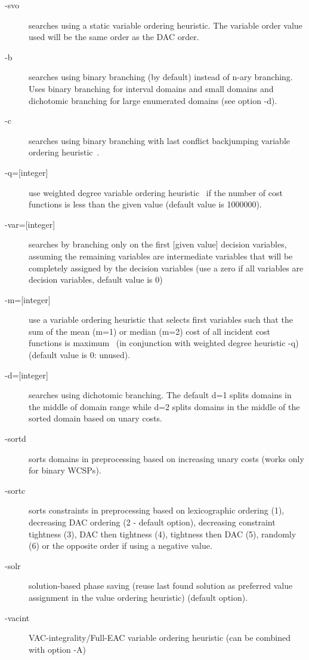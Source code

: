 \documentclass{article}
\begin{document}
\begin{description}
\item[-svo] searches using a static variable ordering heuristic. The
  variable order value used will be the same order as the DAC order.
\item[-b] searches using binary branching (by default) instead of n-ary branching.
  Uses binary branching for interval domains and small domains
  and dichotomic branching for large enumerated domains (see option -d).
\item[-c] searches using binary branching with last conflict
  backjumping variable ordering heuristic~\cite{Lecoutre09}.
\item[{-q=[integer]}] use
  weighted degree variable ordering heuristic~\cite{boussemart2004} if the number of cost
  functions is less than the given value (default value is 1000000).
\item[{-var=[integer]}]
  searches by branching only on the first [given value]
  decision variables, assuming the remaining variables are
  intermediate variables that will be completely assigned by the
  decision variables (use a zero if all variables are decision
  variables, default value is 0)
\item[{-m=[integer]}]
  use a variable ordering heuristic that selects first variables such
  that the sum of the mean (m=1) or median (m=2) cost of all incident
  cost functions is maximum~\cite{Schiex14a} (in conjunction with weighted degree
  heuristic -q) (default value is 0: unused).
\item[{-d=[integer]}]
  searches using dichotomic branching. The default d=1 splits domains
  in the middle of domain range while d=2 splits domains in the middle
  of the sorted domain based on unary costs. 
\item[-sortd] sorts domains in preprocessing based on increasing unary costs (works only for binary WCSPs).
\item[-sortc] sorts constraints in preprocessing based on lexicographic ordering (1), decreasing DAC ordering (2 - default option), decreasing constraint tightness (3), DAC then tightness (4), tightness then DAC (5), randomly (6) or the opposite order if using a negative value.
\item[-solr] solution-based phase saving (reuse last found solution as preferred value assignment in the value ordering heuristic) (default option).
\item[-vacint] VAC-integrality/Full-EAC variable ordering heuristic (can be combined with option -A)
\end{description}
\end{document}
